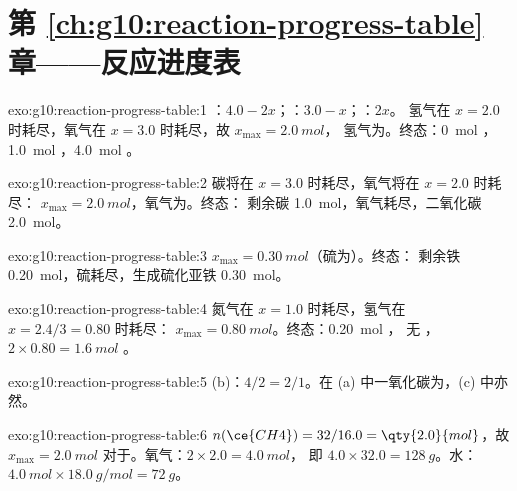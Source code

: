 \section*{第 \ref{ch:g10:reaction-progress-table} 章——反应进度表}

\begin{solution}{exo:g10:reaction-progress-table:1}
：$4.0 - 2x$；：$3.0 - x$；：$2x$。
氢气在 $x = 2.0$ 时耗尽，氧气在 $x = 3.0$ 时耗尽，故 $x_{\max} = \qty{2.0}{mol}$，
氢气为。终态：\qty{0}{mol} ，
\qty{1.0}{mol} ，\qty{4.0}{mol} 。
\end{solution}

\begin{solution}{exo:g10:reaction-progress-table:2}
碳将在 $x = 3.0$ 时耗尽，氧气将在 $x = 2.0$ 时耗尽：
$x_{\max} = \qty{2.0}{mol}$，氧气为。终态：
剩余碳 \qty{1.0}{mol}，氧气耗尽，二氧化碳 \qty{2.0}{mol}。
\end{solution}

\begin{solution}{exo:g10:reaction-progress-table:3}
$x_{\max} = \qty{0.30}{mol}$（硫为）。终态：
剩余铁 \qty{0.20}{mol}，硫耗尽，生成硫化亚铁 \qty{0.30}{mol}。
\end{solution}

\begin{solution}{exo:g10:reaction-progress-table:4}
氮气在 $x = 1.0$ 时耗尽，氢气在 $x = 2.4/3 = 0.80$ 时耗尽：
$x_{\max} = \qty{0.80}{mol}$。终态：\qty{0.20}{mol} ，
无 ，$2 \times 0.80 = \qty{1.6}{mol}$ 。
\end{solution}

\begin{solution}{exo:g10:reaction-progress-table:5}
(b)：$4/2 = 2/1$。在 (a) 中一氧化碳为，(c) 中亦然。
\end{solution}

\begin{solution}{exo:g10:reaction-progress-table:6}
$n(\ce{CH4}) = 32 / 16.0 = \qty{2.0}{mol}$，故 $x_{\max} = \qty{2.0}{mol}$
对于。氧气：$2 \times 2.0 = \qty{4.0}{mol}$，
即 $4.0 \times 32.0 = \qty{128}{g}$。水：
$\qty{4.0}{mol} \times \qty{18.0}{g/mol} = \qty{72}{g}$。
\end{solution}

